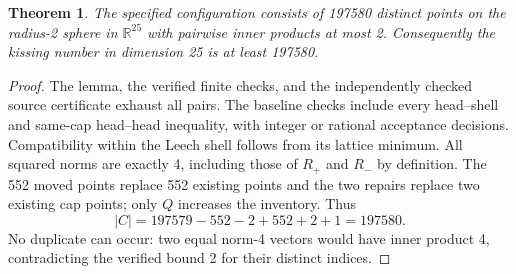 \documentclass[11pt]{article}
\newtheorem{theorem}{Theorem}
\begin{document}
\begin{theorem}
The specified configuration consists of 197580 distinct points on
the radius-2 sphere in $\mathbb R^{25}$ with pairwise inner products at
most 2. Consequently the kissing number in dimension 25 is at least 197580.
\end{theorem}

\begin{proof}
The lemma, the verified finite checks, and the independently checked source
certificate exhaust all pairs. The baseline checks include every head--shell
and same-cap head--head inequality, with integer or rational acceptance
decisions. Compatibility within the Leech shell follows from its lattice
minimum.
All squared norms are exactly 4, including those of $R_+$ and $R_-$ by
definition. The 552 moved points replace 552 existing points and the two
repairs replace two existing cap points; only $Q$ increases the inventory.
Thus
\[
 |C|=197579-552-2+552+2+1=197580.
\]
No duplicate can occur: two equal norm-4 vectors would have inner product
4, contradicting the verified bound 2 for their distinct indices.
\end{proof}
\end{document}
